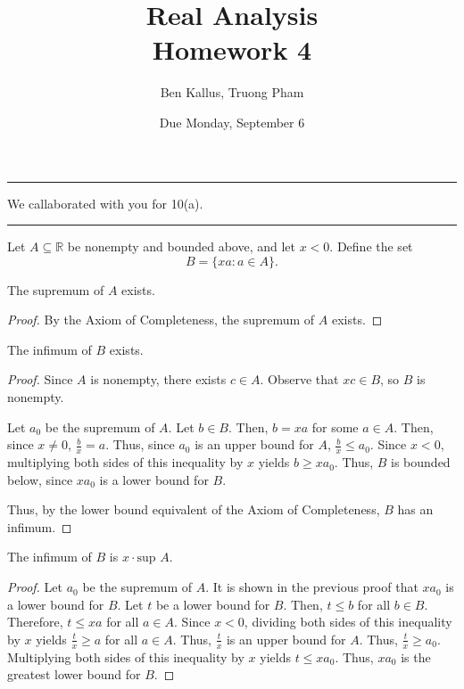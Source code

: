 \documentclass[12pt]{article}
\title{Real Analysis \\ Homework 4}
\author{Ben Kallus, Truong Pham}
\date{Due Monday, September 6}
\begin{document}
\maketitle

\hrule
\bigskip

  We callaborated with you for 10(a).

\bigskip
\hrule
\bigskip

 Let $A \subseteq \mathbb R$ be nonempty and bounded above, and let $x < 0$. Define the set $$B = \{xa:a\in A\}.$$

 The supremum of $A$ exists.

\begin{proof}
    By the Axiom of Completeness, the supremum of $A$ exists.
\end{proof}

\medskip
{} The infimum of $B$ exists.

\begin{proof}

    Since $A$ is nonempty, there exists $c \in A$. Observe that $xc \in B$, so $B$ is nonempty.

    Let $a_0$ be the supremum of $A$. Let $b \in B$. Then, $b=xa$ for some $a \in A$. Then, since $x \neq 0$, $\frac b x = a$. Thus, since $a_0$ is an upper bound for $A$, $\frac b x \leq a_0$. Since $x<0$, multiplying both sides of this inequality by $x$ yields $b \geq xa_0$. Thus, $B$ is bounded below, since $xa_0$ is a lower bound for $B$.

    Thus, by the lower bound equivalent of the Axiom of Completeness, $B$ has an infimum.

\end{proof}

\medskip
{} The infimum of $B$ is $x \cdot \text{sup } A$.

\begin{proof}
    Let $a_0$ be the supremum of $A$. It is shown in the previous proof that $xa_0$ is a lower bound for $B$. Let $t$ be a lower bound for $B$. Then, $t \leq b$ for all $b \in B$. Therefore, $t \leq xa$ for all $a \in A$. Since $x < 0$, dividing both sides of this inequality by $x$ yields $\frac t x \geq a$ for all $a \in A$. Thus, $\frac t x$ is an upper bound for $A$. Thus, $\frac t x \geq a_0$. Multiplying both sides of this inequality by $x$ yields $t \leq xa_0$. Thus, $xa_0$ is the greatest lower bound for $B$.
\end{proof}
\end{document}
